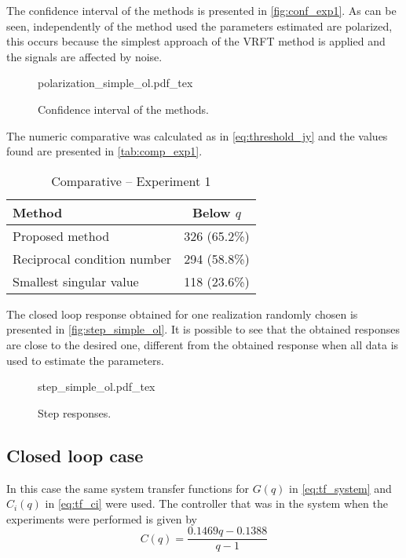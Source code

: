The confidence interval of the methods is presented in \autoref{fig:conf_exp1}.
As can be seen, independently of the method used the parameters estimated are polarized, this occurs because the simplest approach of the VRFT method is applied and the signals are affected by noise.
\begin{figure}[h!]
  \centering
  \def\svgwidth{\columnwidth}
  {\footnotesize{polarization_simple_ol.pdf_tex}}
  \caption{\label{fig:conf_exp1} Confidence interval of the methods.}
\end{figure}


The numeric comparative was calculated as in \eqref{eq:threshold_jy} and the values found are presented in \autoref{tab:comp_exp1}.
\begin{table}[h!]
  \caption{Comparative -- Experiment 1 \label{tab:comp_exp1}}
  \centering
  \begin{tabular}{lc}
  \toprule
  Method & Below $q$\\
  \midrule
  Proposed method & 326 (65.2\%) \\
  Reciprocal condition number & 294 (58.8\%) \\
  Smallest singular value & 118 (23.6\%) \\
  \bottomrule
  \end{tabular}
\end{table}

The closed loop response obtained for one realization randomly chosen is presented in \autoref{fig:step_simple_ol}.
It is possible to see that the obtained responses are close to the desired one, different from the obtained response when all data is used to estimate the parameters.
\begin{figure}[h!]
  \centering
  \def\svgwidth{\columnwidth}
  {\footnotesize{step_simple_ol.pdf_tex}}
  \caption{\label{fig:step_simple_ol} Step responses.}
\end{figure}


\subsection{Closed loop case}
In this case the same system transfer functions for $G(q)$ in \eqref{eq:tf_system} and $C_i(q)$ in \eqref{eq:tf_ci} were used.
The controller that was in the system when the experiments were performed is given by
\begin{equation*}
	C(q) = \frac{0.1469q - 0.1388}{q-1}
\end{equation*}


